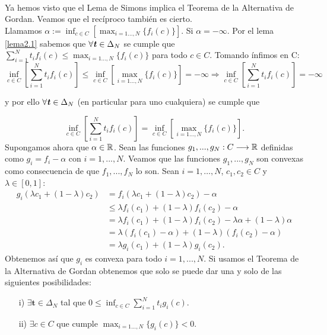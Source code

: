 	\paragraph{} Ya hemos visto que el Lema de Simons implica el Teorema de la Alternativa de Gordan. Veamos que el recíproco también es cierto.  \\
	
	Llamamos $ \alpha := \inf_{ c\in C}\left[\max_{i=1\dots,N } \{f_i(c)\} \right] $. Si $ \alpha = -\infty $. Por el lema \ref{lema2.1} sabemos que $ \forall \textbf{\emph{t}} \in \Delta_N $ se cumple que $ \sum_{i=1}^{N} t_i f_i(c) \leq \max_{i=1\dots,N } \{f_i(c)\}$ para todo $ c \in C$. Tomando ínfimos en C:
	\[
	\inf_{c \in C}\left[ \sum_{i=1}^{N} t_i f_i(c) \right] \leq \inf_{ c\in C}\left[\max_{i=1\dots,N } \{f_i(c)\} \right] = -\infty \Longrightarrow \inf_{ c \in C}\left[ \sum_{i=1}^{N} t_i f_i (c)\right] = -\infty 
	\]
	
	y por ello $ \forall \textbf{\emph{t}} \in \Delta_N $ (en particular para uno cualquiera) se cumple que
	
	\[
	\inf_{c \in C}\left[ \sum_{i=1}^{N} t_i f_i (c) \right] = \inf_{ c\in C}\left[\max_{i=1\dots,N } \{f_i(c)\} \right]. \]
	Supongamos ahora que $ \alpha \in \mathbb{R} $. Sean las funciones $ g_1, ..., g_N: C \longrightarrow \mathbb{R} $ definidas como $ g_i = f_i - \alpha $ con $ i=1,...,N$. Veamos que las funciones $ g_1, ..., g_N $ son convexas como consecuencia de que $ f_1, ..., f_N $ lo son. Sean $ i = 1, \dots, N $, $ c_1,c_2 \in C $ y $ \lambda \in \left[0,1\right] $:
	\begin{equation*}
	\begin{split}
	g_i(\lambda c_1 + (1-\lambda) c_2) &= f_i(\lambda c_1 + (1-\lambda) c_2) - \alpha \\
	&\leq \lambda f_i(c_1) + (1-\lambda)f_i(c_2) - \alpha \\
	&= \lambda f_i(c_1) + (1-\lambda)f_i(c_2) - \lambda \alpha + (1-\lambda)\alpha \\
	&= \lambda( f_i(c_1) - \alpha ) + (1-\lambda) (f_i (c_2) - \alpha) \\
	&= \lambda g_i(c_1) + (1-\lambda) g_i (c_2).
	\end{split}
	\end{equation*}
	Obtenemos así que $ g_i $ es convexa para todo $ i = 1, ..., N $. Si usamos el Teorema de la Alternativa de Gordan obtenemos que solo se puede dar una y solo de las siguientes posibilidades:
	
	\begin{itemize}
		\item[i)] $ \exists \mathbf{t} \in \Delta_N $ tal que $ 0 \leq \inf_{c \in C}  \sum_{i=1}^{N}{t_i g_i (c)}$.
		\item[ii)] $ \exists c \in C $ que cumple $ \max_{i=1\dots,N } \{g_i(c)\}  < 0 $.
	\end{itemize}
	
